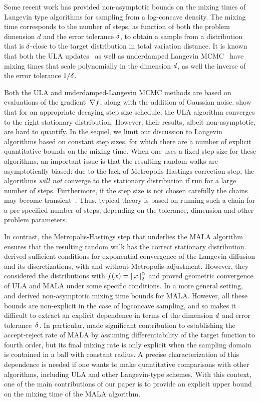 \documentclass[final, 12pt]{colt2018} %
\begin{document}
Some recent work has provided non-asymptotic bounds on the mixing
times of Langevin type algorithms for sampling from a log-concave
density.  The mixing time corresponds to the number of steps, as
function of both the problem dimension $d$ and the error tolerance
$\delta$, to obtain a sample from a distribution that is
$\delta$-close to the target distribution in total variation
distance. It is known that both the ULA
updates~\citep{dalalyan2016theoretical,
  durmus2016high,cheng2017convergence} as well as underdamped Langevin
MCMC~\citep{cheng2017underdamped} have mixing times that scale
polynomially in the dimension $d$, as well the inverse of the
error tolerance $1/\delta$.

Both the ULA and underdamped-Langevin MCMC methods are based on
evaluations of the gradient~$\nabla f$, along with the addition of
Gaussian noise. \citet{durmus2016high} show that
for an appropriate decaying step size schedule, the ULA algorithm
converges to the right stationary distribution. However, their
results, albeit non-asymptotic, are hard to quantify. In the sequel,
we limit our discussion to Langevin algorithms based on constant step
sizes, for which there are a number of explicit quantitative bounds on
the mixing time.  When one uses a fixed step size for these
algorithms, an important issue is that the resulting random walks are
asymptotically biased: due to the lack of Metropolis-Hastings
correction step, the algorithms \emph{will not} converge to the
stationary distribution if run for a large number of steps.
Furthermore, if the step size is not chosen carefully the chains may
become transient~\citep{roberts1996exponential}.  Thus, typical theory
is based on running such a chain for a pre-specified number of steps,
depending on the tolerance, dimension and other problem parameters.


In contrast, the Metropolis-Hastings step that underlies the MALA
algorithm ensures that the resulting random walk has the correct
stationary distribution. \citet{roberts1996exponential} derived sufficient
conditions for exponential convergence of the Langevin
diffusion and its discretizations, with and without Metropolis-adjustment.
However, they considered the distributions with $f(x) = \left\| x\right\|_{2}^\alpha$
and proved geometric convergence of ULA and MALA under some specific conditions.
In a more general setting, \citet{bou2012nonasymptotic} and \citet{eberle2014error}
derived non-asymptotic mixing time bounds for MALA.
However, all these bounds are non-explicit in the case of logconcave sampling, and so makes it
difficult to extract an explicit dependence in terms of the dimension
$d$ and error tolerance~$\delta$. In particular, \citet{eberle2014error} made significant contribution to establishing the accept-reject rate of MALA by assuming differentiability of the target function to fourth order, but its final mixing rate is only explicit when the sampling domain is contained in a ball with constant radius.  A precise characterization of this
dependence is needed if one wants to make quantitative comparisons
with other algorithms, including ULA and other Langevin-type schemes.
With this context, one of the main contributions of our paper is to
provide an explicit upper bound on the mixing time of the MALA
algorithm.
\end{document}
